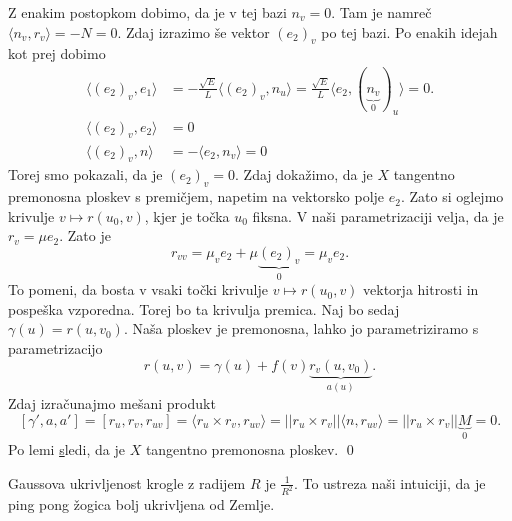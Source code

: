 Z enakim postopkom dobimo, da je v tej bazi $n_v = 0$. Tam je namreč $\langle n_v, r_v \rangle = - N = 0.$
Zdaj izrazimo še vektor $(e_2)_v$ po tej bazi. Po enakih idejah kot prej dobimo \begin{align*}
  \langle (e_2)_v, e_1 \rangle &=  -\frac{\sqrt{E} }{L} \langle (e_2)_v, n_u \rangle = \frac{\sqrt{E}}{L} \langle e_2, (\underbrace{n_v}_0)_u \rangle = 0.  \\
  \langle (e_2)_v, e_2 \rangle   &= 0 \\
  \langle (e_2)_v, n \rangle &= - \langle e_2, n_v \rangle = 0   
\end{align*}
Torej smo pokazali, da je $(e_2)_v = 0$. Zdaj dokažimo, da je $X$ tangentno premonosna ploskev s premičjem, napetim
na vektorsko polje $e_2$. Zato si oglejmo krivulje $v \mapsto r(u_0, v)$, kjer je točka $u_0$ fiksna. V naši parametrizaciji velja,
da je $r_v = \mu e_2$. Zato je \begin{equation*}
r_{vv} = \mu_v e_2 + \mu \underbrace{ (e_2)_v}_0  = \mu_v e_2.
\end{equation*}  
To pomeni, da bosta v vsaki točki krivulje $v \mapsto r(u_0, v)$ vektorja hitrosti in pospeška vzporedna. Torej bo ta krivulja premica. Naj bo sedaj
$\gamma(u) = r(u, v_0)$. Naša ploskev je premonosna, lahko jo parametriziramo s parametrizacijo \begin{equation*}
r(u,v) = \gamma(u) + f(v) \underbrace{r_v(u, v_0)}_{a(u)}. 
\end{equation*}  
Zdaj izračunajmo mešani produkt \begin{equation*}
\left[ \gamma', a , a' \right] = \left[ r_u, r_v, r_{uv} \right]
= \langle r_u \times  r_v, r_{uv} \rangle = \lvert\lvert r_u \times  r_v \rvert\rvert \langle n, r_{uv} \rangle
= \lvert\lvert r_u \times r_v \rvert\rvert \underbrace{M}_0  = 0.
\end{equation*}  
Po lemi \href{lem_tangentno_premonosna_mesani_produkt} sledi, da je $X$ tangentno premonosna ploskev.
\qed

\begin{opomba}
Gaussova ukrivljenost krogle z radijem $R$ je $\frac{1}{R^2}$. To ustreza naši intuiciji, da je ping pong žogica bolj ukrivljena od Zemlje.
\end{opomba}